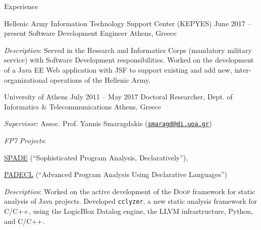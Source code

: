 \documentclass{resume}
\begin{document}
\begin{rSection}{Experience}

\begin{rSubsection}
  {Hellenic Army Information Technology Support Center (KEPYES)}
  {June 2017 -- present}
  {Software Development Engineer}
  {Athens, Greece}
\item \emph{Description}: Served in the Research and Informatics Corps
  (mandatory military service) with Software Development
  responsibilities. Worked on the development of a Java EE Web
  application with JSF to support existing and add new,
  inter-organizational operations of the Hellenic Army.
\end{rSubsection}


\begin{rSubsection}
  {University of Athens}
  {July 2011 -- May 2017}
  {Doctoral Researcher, Dept. of Informatics \& Telecommunications}
  {Athens, Greece}
\item \emph{Supervisor}: Assoc. Prof. Yannis Smaragdakis
  (\href{mailto:smaragd@di.uoa.gr}{\nolinkurl{smaragd@di.uoa.gr}})
\item \emph{FP7 Projects}:
  \begin{inparaenum}[(1)]
  \item
    \href{http://cordis.europa.eu/project/rcn/104361_en.html}{SPADE}
    (``Sophisticated Program Analysis, Declaratively''),
  \item
    \href{http://cordis.europa.eu/project/rcn/95729_en.html}{PADECL}
    (``Advanced Program Analysis Using Declarative Languages'')
  \end{inparaenum}
\item \emph{Description}: Worked on the active development of the
  \textsc{Doop} framework for static analysis of Java
  projects. Developed \texttt{cclyzer}, a new static analysis
  framework for C/C++, using the LogicBlox Datalog engine, the LLVM
  infrastructure, Python, and C/C++.
\end{rSubsection}



\end{rSection}
\end{document}
